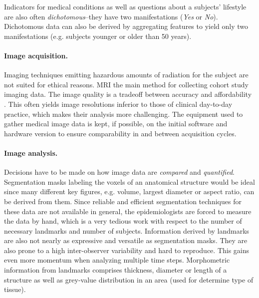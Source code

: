 \documentclass[journal]{style/vgtc} 			          %
\begin{document}
Indicators for medical conditions as well as questions about a subjects' lifestyle are also often \emph{dichotomous}--they have two manifestations (\emph{Yes} or \emph{No}).
%
%
Dichotomous data can also be derived by aggregating features to yield only two manifestations (e.g. subjects younger or older than 50 years).
%

\paragraph{Image acquisition.} \label{ImageAcquisition} Imaging techniques emitting hazardous amounts of radiation for the subject are not suited for ethical reasons.
%
MRI the main method for collecting cohort study imaging data.
%
The image quality is a tradeoff between accuracy and affordability \cite{Preim2014}.
%
This often yields image resolutions inferior to those of clinical day-to-day practice, which makes their analysis more challenging.
%
The equipment used to gather medical image data is kept, if possible, on the initial software and hardware version to ensure comparability in and between acquisition cycles.

\paragraph{Image analysis.} \label{ImageAnalysis} Decisions have to be made on how image data are \emph{compared} and \emph{quantified}.
%
Segmentation masks labeling the voxels of an anatomical structure would be ideal since many different key figures, e.g. volume, largest diameter or aspect ratio, can be derived from them.
%
Since reliable and efficient segmentation techniques for these data are not available in general, the epidemiologists are forced to measure the data by hand, which is a very tedious work with respect to the number of necessary landmarks and number of subjects.
%
Information derived by landmarks are also not nearly as expressive and versatile as segmentation masks.
%
They are also prone to a high inter-observer variability and hard to reproduce.
%
This gains even more momentum when analyzing multiple time steps.
%
Morphometric information from landmarks comprises thickness, diameter or length of a structure as well as grey-value distribution in an area (used for determine type of tissue).
\end{document}

